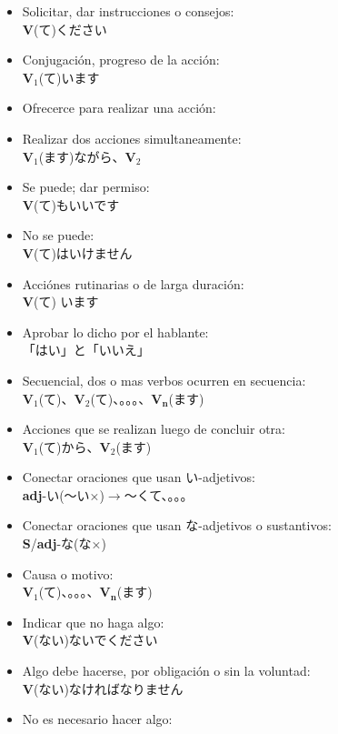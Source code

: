 \documentclass[a4paper,12pt,oneside]{report}
\def\to{$\longrightarrow$}
\def\bv{\textbf{V}} %
\def\bs{\textbf{S}} %
\def\adj{\textbf{adj}} %
\def\vi{$\mathrm{\bv}_1$} %
\def\vn{$\mathrm{\bv}_2$} %
\def\vene{$\mathrm{\bv}_\mathrm{\textbf{n}}$} %
\def\tenten{。。。}
\begin{document}
\begin{CJK*}{UTF8}{min}
  \begin{itemize}
    \item Solicitar, dar instrucciones o consejos:\\
          \bv(て)ください
    \item Conjugaci\'on, progreso de la acci\'on:\\
          \vi(て)います
    \item Ofrecerce para realizar una acci\'on:\\
    \item Realizar dos acciones simultaneamente:\\
          \vi(ます)ながら、\vn
    \item Se puede; dar permiso:\\
          \bv(て)もいいです
    \item No se puede:\\
          \bv(て)はいけません
    \item Acci\'ones rutinarias o de larga duraci\'on:\\
          \bv(て) います
    \item Aprobar lo dicho por el hablante:\\
          「はい」と「いいえ」
    \item Secuencial, dos o mas verbos ocurren en secuencia:\\
          \vi(て)、\vn(て)、\tenten、\vene(ます)
    \item Acciones que se realizan luego de concluir otra:\\
          \vi(て)から、\vn(ます)
    \item Conectar oraciones que usan い-adjetivos:\\
          \adj-い(〜い×)\to〜くて、\tenten
    \item Conectar oraciones que usan な-adjetivos o sustantivos:\\
          \bs/\adj-な(な×)
    \item Causa o motivo:\\
          \vi(て)、\tenten、\vene(ます)
    \item Indicar que no haga algo:\\
          \bv(ない)ないでください
    \item Algo debe hacerse, por obligación o sin la voluntad:\\
          \bv(ない)なければなりません
    \item No es necesario hacer algo:\\

\end{itemize}
\end{CJK*}
\end{document}
